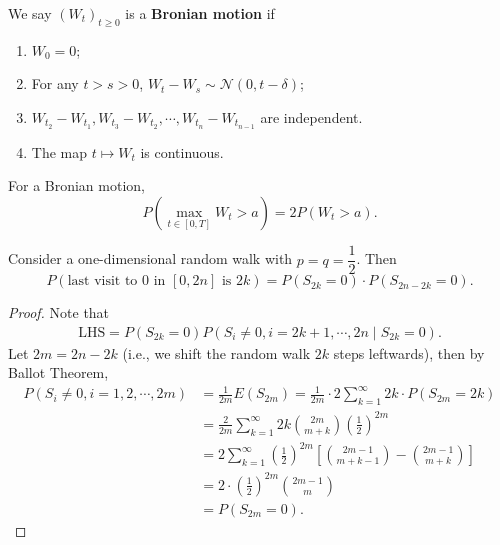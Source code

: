 \documentclass[11pt,singlecolumn, openany, citestyle=authoryear]{elegantbook}
\begin{document}
\begin{CJK}{UTF8}{gbsn}
\begin{remark}
    We say $(W_t)_{t\geqslant 0}$ is a \textbf{Bronian motion} if 
    \begin{enumerate}
        \item $W_0=0$;
        \item For any $t>s>0$, $W_t-W_s\sim \mathcal{N}(0,t-\delta)$;
        \item $W_{t_2}-W_{t_1},W_{t_3}-W_{t_2},\cdots,W_{t_n}-W_{t_{n-1}}$
        are independent.
        \item The map $t\mapsto W_t$ is continuous.
    \end{enumerate} 
\end{remark}

\begin{theorem}
For a Bronian motion,
$$
P(\max_{t\in[0,T]}W_t > a)=2P(W_t>a).
$$    
\end{theorem}

\begin{theorem}
    Consider a one-dimensional random walk with $p=q=\dfrac{1}{2}$. Then 
    $$
    P(\text{last visit to }0 \text{ in }[0,2n] \text{ is } 2k)=
    P(S_{2k}=0)\cdot P({S_{2n-2k}}=0).
    $$
\end{theorem}
\begin{proof}
    Note that 
    \begin{align*}
        \text{LHS} = P(S_{2k}=0) P(S_i\neq 0,i=2k+1,\cdots,2n \mid S_{2k}=0).
    \end{align*}
    Let $2m=2n-2k$ (i.e., we shift the random walk $2k$ steps leftwards),
    then by Ballot Theorem,
    \begin{align*}
    P(S_i\neq 0,i=1,2,\cdots,2m)&=\frac{1}{2m}E(S_{2m})=
    \frac{1}{2m} \cdot 2\sum_{k=1}^\infty 2k\cdot P(S_{2m}=2k)\\
    &=\frac{2}{2m} \sum_{k=1}^\infty 2k \binom{2m}{m+k} \left(
        \frac{1}{2}
    \right)^{2m}\\
    &=2 \sum_{k=1}^\infty \left(
        \frac{1}{2}
    \right)^{2m} \left[\binom{2m-1}{m+k-1}-\binom{2m-1}{m+k}\right]\\
    &=2\cdot \left(
        \frac{1}{2}
    \right)^{2m} \binom{2m-1}{m}\\
    &=P(S_{2m}=0). 
    \end{align*}
\end{proof}


\end{CJK}
\end{document}
